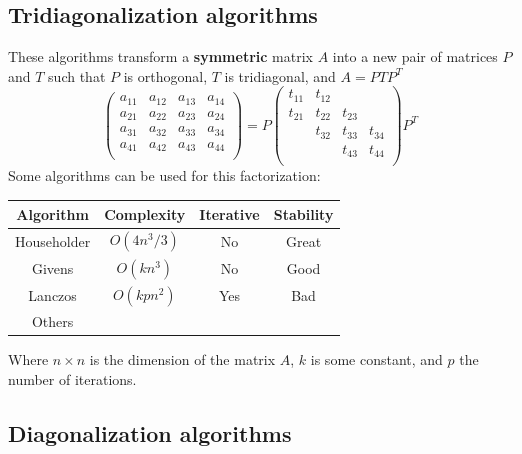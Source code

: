 \documentclass[11pt,a4paper]{article}
\newcommand*\mat[1]{ \begin{pmatrix} #1 \end{pmatrix}}
\begin{document}
\subsection{Tridiagonalization algorithms}

These algorithms transform a \textbf{symmetric} matrix $A$ into a new pair of 
matrices $P$ and $T$ such that $P$ is orthogonal, $T$ is tridiagonal, and $A = 
P T P^T$
%
$$
	\mat{
		a_{11} & a_{12} & a_{13} & a_{14} \\
		a_{21} & a_{22} & a_{23} & a_{24} \\
		a_{31} & a_{32} & a_{33} & a_{34} \\
		a_{41} & a_{42} & a_{43} & a_{44} \\
	} =
	P
	\mat{
		t_{11} & t_{12} &        &        \\
		t_{21} & t_{22} & t_{23} &        \\
		       & t_{32} & t_{33} & t_{34} \\
		       &        & t_{43} & t_{44} \\
	}
	P^T
$$
%
Some algorithms can be used for this factorization:
%
\begin{center}
\begin{tabular}{c c c c}
	\toprule
	Algorithm 		& Complexity  & Iterative & Stability\\
	\midrule
	Householder		& $O(4n^3/3)$ & No        & Great\\
	Givens				& $O(kn^3)$   & No        & Good \\
	Lanczos				& $O(kpn^2)$  & Yes       & Bad \\
	Others				&             &          \\
	\bottomrule
\end{tabular}
\end{center}
%
Where $n \times n$ is the dimension of the matrix $A$, $k$ is some constant, and 
$p$ the number of iterations.

\subsection{Diagonalization algorithms}
\end{document}
